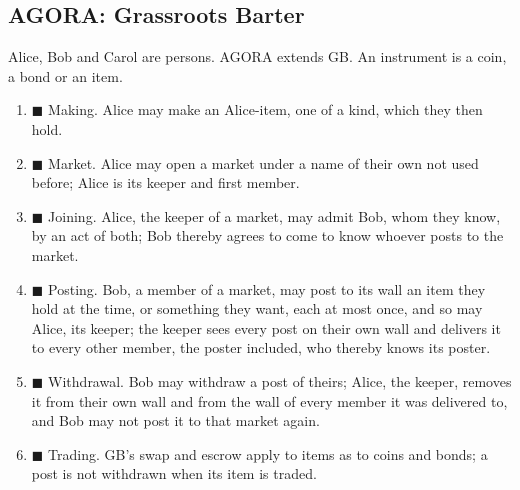 \subsection*{AGORA: Grassroots Barter}
\begin{contractbox}
Alice, Bob and Carol are persons.  AGORA extends GB.  An instrument is a coin, a bond or an item.\par\smallskip
\begin{enumerate}[leftmargin=*]
\item $\blacksquare$ Making.  Alice may make an Alice-item, one of a kind, which they then hold.
\item $\blacksquare$ Market.  Alice may open a market under a name of their own not used before; Alice is its keeper and first member.
\item $\blacksquare$ Joining.  Alice, the keeper of a market, may admit Bob, whom they know, by an act of both; Bob thereby agrees to come to know whoever posts to the market.
\item $\blacksquare$ Posting.  Bob, a member of a market, may post to its wall an item they hold at the time, or something they want, each at most once, and so may Alice, its keeper; the keeper sees every post on their own wall and delivers it to every other member, the poster included, who thereby knows its poster.
\item $\blacksquare$ Withdrawal.  Bob may withdraw a post of theirs; Alice, the keeper, removes it from their own wall and from the wall of every member it was delivered to, and Bob may not post it to that market again.
\item $\blacksquare$ Trading.  GB's swap and escrow apply to items as to coins and bonds; a post is not withdrawn when its item is traded.
\end{enumerate}
\end{contractbox}


